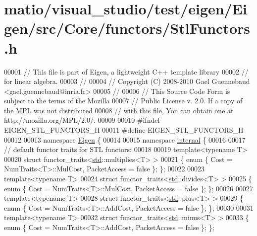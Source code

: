 \hypertarget{matio_2visual__studio_2test_2eigen_2_eigen_2src_2_core_2functors_2_stl_functors_8h_source}{}\section{matio/visual\+\_\+studio/test/eigen/\+Eigen/src/\+Core/functors/\+Stl\+Functors.h}
\label{matio_2visual__studio_2test_2eigen_2_eigen_2src_2_core_2functors_2_stl_functors_8h_source}

\begin{DoxyCode}
00001 \textcolor{comment}{// This file is part of Eigen, a lightweight C++ template library}
00002 \textcolor{comment}{// for linear algebra.}
00003 \textcolor{comment}{//}
00004 \textcolor{comment}{// Copyright (C) 2008-2010 Gael Guennebaud <gael.guennebaud@inria.fr>}
00005 \textcolor{comment}{//}
00006 \textcolor{comment}{// This Source Code Form is subject to the terms of the Mozilla}
00007 \textcolor{comment}{// Public License v. 2.0. If a copy of the MPL was not distributed}
00008 \textcolor{comment}{// with this file, You can obtain one at http://mozilla.org/MPL/2.0/.}
00009 
00010 \textcolor{preprocessor}{#ifndef EIGEN\_STL\_FUNCTORS\_H}
00011 \textcolor{preprocessor}{#define EIGEN\_STL\_FUNCTORS\_H}
00012 
00013 \textcolor{keyword}{namespace }\hyperlink{namespace_eigen}{Eigen} \{
00014 
00015 \textcolor{keyword}{namespace }\hyperlink{namespaceinternal}{internal} \{
00016 
00017 \textcolor{comment}{// default functor traits for STL functors:}
00018 
00019 \textcolor{keyword}{template}<\textcolor{keyword}{typename} T>
00020 \textcolor{keyword}{struct }functor\_traits<\hyperlink{namespacestd}{std}::multiplies<T> >
00021 \{ \textcolor{keyword}{enum} \{ Cost = NumTraits<T>::MulCost, PacketAccess = \textcolor{keyword}{false} \}; \};
00022 
00023 \textcolor{keyword}{template}<\textcolor{keyword}{typename} T>
00024 \textcolor{keyword}{struct }functor\_traits<\hyperlink{namespacestd}{std}::divides<T> >
00025 \{ \textcolor{keyword}{enum} \{ Cost = NumTraits<T>::MulCost, PacketAccess = \textcolor{keyword}{false} \}; \};
00026 
00027 \textcolor{keyword}{template}<\textcolor{keyword}{typename} T>
00028 \textcolor{keyword}{struct }functor\_traits<\hyperlink{namespacestd}{std}::plus<T> >
00029 \{ \textcolor{keyword}{enum} \{ Cost = NumTraits<T>::AddCost, PacketAccess = \textcolor{keyword}{false} \}; \};
00030 
00031 \textcolor{keyword}{template}<\textcolor{keyword}{typename} T>
00032 \textcolor{keyword}{struct }functor\_traits<\hyperlink{namespacestd}{std}::minus<T> >
00033 \{ \textcolor{keyword}{enum} \{ Cost = NumTraits<T>::AddCost, PacketAccess = \textcolor{keyword}{false} \}; \};

\end{DoxyCode}
